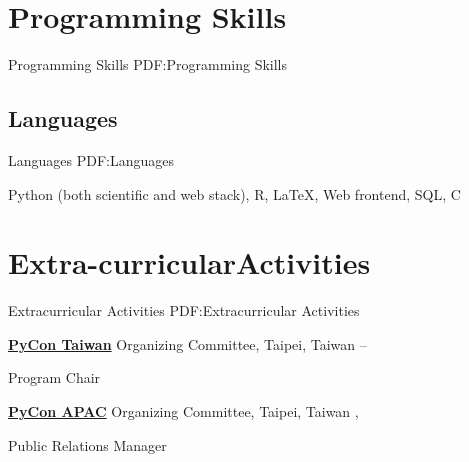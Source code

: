 \documentclass[a4paper,12pt,oneside]{article}
\begin{document}
\begin{body}

\section{Programming Skills}
{Programming Skills}
{PDF:Programming Skills}

\subsection{Languages}
{Languages}
{PDF:Languages}

Python (both scientific and web stack),
R,
\LaTeX,
Web frontend,
SQL,
C

%


\section{Extra-\newline curricular\newline Activities}
{Extracurricular Activities}
{PDF:Extracurricular Activities}

\href{http://pycon.tw}{\textbf{PyCon Taiwan}} Organizing Committee, Taipei, Taiwan
\hfill
{} --
\par
Program Chair

\EntryGapNoBreak
\href{http://pycon.tw}{\textbf{PyCon APAC}} Organizing Committee, Taipei, Taiwan
\hfill
{},
\par
Public Relations Manager


\end{body}
\end{document}
